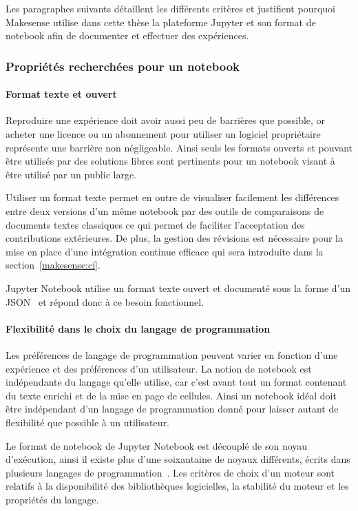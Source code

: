 Les paragraphes suivants détaillent les différents critères et justifient pourquoi Makesense utilise dans cette thèse la plateforme Jupyter et son format de notebook afin de documenter et effectuer des expériences.

\subsubsection{Propriétés recherchées pour un notebook}
\label{makesense:justification_notebook}

\paragraph{Format texte et ouvert}

Reproduire une expérience doit avoir aussi peu de barrières que possible, or acheter une licence ou un abonnement pour utiliser un logiciel propriétaire représente une barrière non négligeable.
Ainsi seuls les formats ouverts et pouvant être utilisés par des solutions libres sont pertinents pour un notebook visant à être utilisé par un public large.

Utiliser un format texte permet en outre de visualiser facilement les différences entre deux versions d'un même notebook par des outils de comparaisons de documents textes classiques ce qui permet de faciliter l'acceptation des contributions extérieures.
De plus, la gestion des révisions est nécessaire pour la mise en place d'une intégration continue efficace qui sera introduite dans la section~\ref{makesense:ci}.

Jupyter Notebook utilise un format texte ouvert et documenté sous la forme d'un \ac{JSON}~\cite{notebookformat} et répond donc à ce besoin fonctionnel.

\paragraph{Flexibilité dans le choix du langage de programmation}

Les préférences de langage de programmation peuvent varier en fonction d'une expérience et des préférences d'un utilisateur.
La notion de notebook est indépendante du langage qu'elle utilise, car c'est avant tout un format contenant du texte enrichi et de la mise en page de cellules.
Ainsi un notebook idéal doit être indépendant d'un langage de programmation donné pour laisser autant de flexibilité que possible à un utilisateur.

Le format de notebook de Jupyter Notebook est découplé de son noyau d'exécution, ainsi il existe plus d'une soixantaine de noyaux différents, écrits dans plusieurs langages de programmation~\cite{poweredbyjupyter}.
Les critères de choix d'un moteur sont relatifs à la disponibilité des bibliothèques logicielles, la stabilité du moteur et les propriétés du langage.

